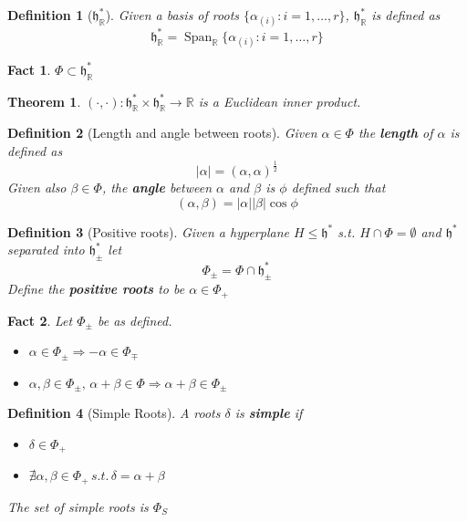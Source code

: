 \documentclass{article}
\newtheorem{theorem}{Theorem}[subsection]
\newtheorem{definition}{Definition}[subsection]
\newtheorem{fact}{Fact}[subsection]
\DeclareMathOperator{\spn}{Span}
\newcommand{\bam}[1]{\textbf{#1}}
\newcommand{\mf}[1]{\mathfrak{#1}}
\newcommand{\mbb}[1]{\mathbb{#1}}
\begin{document}
\begin{definition}[$\mf{h}^\ast_\mbb{R}$]
Given a basis of roots $\lbrace \alpha_{(i)} : i=1,\dots,r \rbrace$, $\mf{h}^\ast_\mbb{R}$ is defined as 
\[
\mf{h}^\ast_\mbb{R} = \spn_\mbb{R} \lbrace \alpha_{(i)} : i=1,\dots,r \rbrace
\]
\end{definition}

\begin{fact}
$\Phi\subset\mf{h}^\ast_\mbb{R}$
\end{fact}

\begin{theorem}
$(\cdot,\cdot) : \mf{h}^\ast_\mbb{R} \times \mf{h}^\ast_\mbb{R} \to \mbb{R}$ is a Euclidean inner product. 
\end{theorem}

\begin{definition}[Length and angle between roots]
Given $\alpha\in\Phi$ the \bam{length} of $\alpha$ is defined as 
\[
|\alpha|=(\alpha,\alpha)^\frac{1}{2}
\]
Given also $\beta\in\Phi$, the \bam{angle} between $\alpha$ and $\beta$ is $\phi$ defined such that 
\[
(\alpha, \beta) = |\alpha||\beta|\cos{\phi}
\]
\end{definition}

\begin{definition}[Positive roots]
Given a hyperplane $H\leq\mf{h}^\ast$ s.t. $H\cap\Phi=\emptyset$ and $\mf{h}^\ast$ separated into $\mf{h}^\ast_\pm$ let 
\[
\Phi_\pm=\Phi\cap\mf{h}^\ast_\pm
\]
Define the \bam{positive roots} to be $\alpha\in\Phi_+$
\end{definition}

\begin{fact} Let $\Phi_\pm$ be as defined.
\begin{itemize}
    \item $\alpha\in\Phi_\pm \Rightarrow -\alpha\in\Phi_\mp$
    \item $\alpha,\beta\in\Phi_\pm,\, \alpha+\beta\in\Phi \Rightarrow \alpha+\beta\in\Phi_\pm$
\end{itemize}
\end{fact}

\begin{definition}[Simple Roots]
A roots $\delta$ is \bam{simple} if 
\begin{itemize}
\item $\delta\in\Phi_+$
\item $\nexists \alpha,\beta\in\Phi_+ \, s.t. \, \delta=\alpha+\beta$
\end{itemize}
The set of simple roots is $\Phi_S$
\end{definition}
\end{document}
